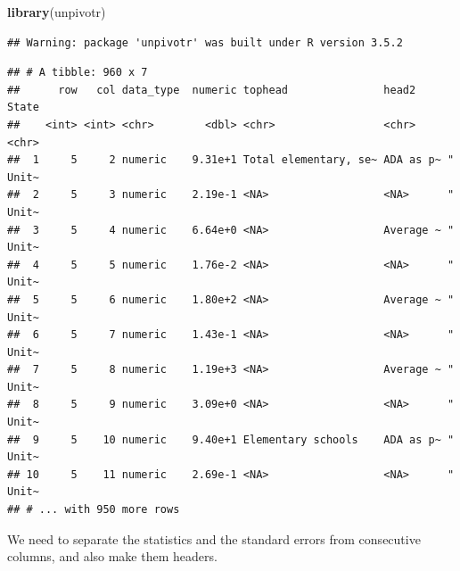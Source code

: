 \documentclass[12pt,letterpaperpaper,openany]{book}
\newenvironment{Shaded}{\begin{snugshade}}{\end{snugshade}}
\newcommand{\KeywordTok}[1]{\textcolor[rgb]{0.13,0.29,0.53}{\textbf{#1}}}
\newcommand{\NormalTok}[1]{#1}
\newcommand{\OperatorTok}[1]{\textcolor[rgb]{0.81,0.36,0.00}{\textbf{#1}}}
\newcommand{\StringTok}[1]{\textcolor[rgb]{0.31,0.60,0.02}{#1}}
\begin{document}
\begin{Shaded}
\begin{Highlighting}[]
\KeywordTok{library}\NormalTok{(unpivotr)}
\end{Highlighting}
\end{Shaded}

\begin{verbatim}
## Warning: package 'unpivotr' was built under R version 3.5.2
\end{verbatim}

\begin{Shaded}
\end{Shaded}

\begin{verbatim}
## # A tibble: 960 x 7
##      row   col data_type  numeric tophead               head2     State    
##    <int> <int> <chr>        <dbl> <chr>                 <chr>     <chr>    
##  1     5     2 numeric    9.31e+1 Total elementary, se~ ADA as p~ "   Unit~
##  2     5     3 numeric    2.19e-1 <NA>                  <NA>      "   Unit~
##  3     5     4 numeric    6.64e+0 <NA>                  Average ~ "   Unit~
##  4     5     5 numeric    1.76e-2 <NA>                  <NA>      "   Unit~
##  5     5     6 numeric    1.80e+2 <NA>                  Average ~ "   Unit~
##  6     5     7 numeric    1.43e-1 <NA>                  <NA>      "   Unit~
##  7     5     8 numeric    1.19e+3 <NA>                  Average ~ "   Unit~
##  8     5     9 numeric    3.09e+0 <NA>                  <NA>      "   Unit~
##  9     5    10 numeric    9.40e+1 Elementary schools    ADA as p~ "   Unit~
## 10     5    11 numeric    2.69e-1 <NA>                  <NA>      "   Unit~
## # ... with 950 more rows
\end{verbatim}

We need to separate the statistics and the standard errors from consecutive columns, and
also make them headers.
\end{document}

